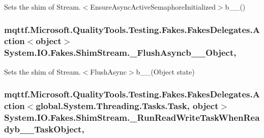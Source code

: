 Sets the shim of Stream.$<$Ensure\-Async\-Active\-Semaphore\-Initialized$>$b\-\_\-\-\_()

\hypertarget{class_system_1_1_i_o_1_1_fakes_1_1_shim_stream_a36f13b281fa4d488a0bcdeea73d17a3b}{
\subsubsection[{\-\_\-\-Flush\-Asyncb\-\_\-\-\_\-8\-Object}]{\setlength{\rightskip}{0pt plus 5cm}mqttf.\-Microsoft.\-Quality\-Tools.\-Testing.\-Fakes.\-Fakes\-Delegates.\-Action$<$object$>$ System.\-I\-O.\-Fakes.\-Shim\-Stream.\-\_\-\-Flush\-Asyncb\-\_\-\-\_\-Object\hspace{0.3cm}{\ttfamily [static]}, {\ttfamily [set]}}}\label{class_system_1_1_i_o_1_1_fakes_1_1_shim_stream_a36f13b281fa4d488a0bcdeea73d17a3b}


Sets the shim of Stream.$<$Flush\-Async$>$b\-\_\-\-\_(\-Object state)

\hypertarget{class_system_1_1_i_o_1_1_fakes_1_1_shim_stream_a9716101748ea9e7357bfa3364473a977}{
\subsubsection[{\-\_\-\-Run\-Read\-Write\-Task\-When\-Readyb\-\_\-\-\_\-13\-Task\-Object}]{\setlength{\rightskip}{0pt plus 5cm}mqttf.\-Microsoft.\-Quality\-Tools.\-Testing.\-Fakes.\-Fakes\-Delegates.\-Action$<$global.\-System.\-Threading.\-Tasks.\-Task, object$>$ System.\-I\-O.\-Fakes.\-Shim\-Stream.\-\_\-\-Run\-Read\-Write\-Task\-When\-Readyb\-\_\-\-\_\-Task\-Object\hspace{0.3cm}{\ttfamily [static]}, {\ttfamily [set]}}}\label{class_system_1_1_i_o_1_1_fakes_1_1_shim_stream_a9716101748ea9e7357bfa3364473a977}


